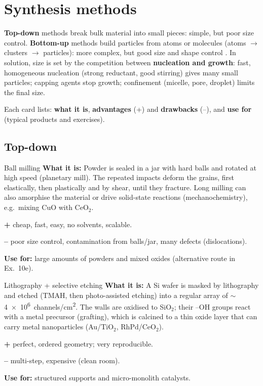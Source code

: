 \section{Synthesis methods}
\label{sec:synthesis}
\textbf{Top-down} methods break bulk material into small pieces: simple, but poor size control. \textbf{Bottom-up} methods build
particles from atoms or molecules (atoms $\to$ clusters $\to$ particles): more complex, but good size and shape control
. In solution, size is set by the competition between \textbf{nucleation and growth}: fast, homogeneous nucleation
(strong reductant, good stirring) gives many small particles; capping agents stop growth; confinement (micelle, pore, droplet)
limits the final size.

Each card lists: \textbf{what it is}, \textbf{advantages} (+) and \textbf{drawbacks} (--), and \textbf{use for} (typical products
and exercises).

\newcommand{\meth}[5]{%
\begin{cardbox}{#1}
\textbf{What it is:} #2\par\smallskip
\textcolor{proc}{\textbf{+}} #3\par
\textcolor{conc}{\textbf{--}} #4\par
\textcolor{recc}{\textbf{Use for:}} #5
\end{cardbox}}

\subsection{Top-down}
\meth{Ball milling }
{Powder is sealed in a jar with hard balls and rotated at high speed (planetary mill). The repeated impacts deform the grains,
first elastically, then plastically and by shear, until they fracture. Long milling can also amorphise the material or drive
solid-state reactions (mechanochemistry), e.g.\ mixing CuO with CeO$_2$.}
{cheap, fast, easy, no solvents, scalable.}
{poor size control, contamination from balls/jar, many defects (dislocations).}
{large amounts of powders and mixed oxides (alternative route in Ex.~10e).}
\meth{Lithography + selective etching }
{A Si wafer is masked by lithography and etched (TMAH, then photo-assisted etching) into a regular array of
$\sim$\SI{4e6}{channels/cm^2}. The walls are oxidised to SiO$_2$; their --OH groups react with a metal precursor (grafting),
which is calcined to a thin oxide layer that can carry metal nanoparticles (Au/TiO$_2$, RhPd/CeO$_2$).}
{perfect, ordered geometry; very reproducible.}
{multi-step, expensive (clean room).}
{structured supports and micro-monolith catalysts.}

